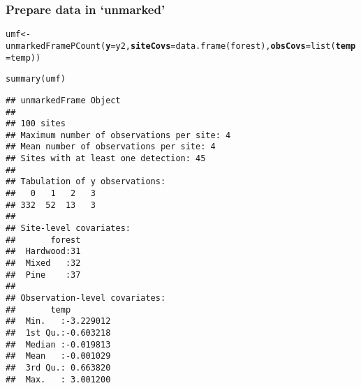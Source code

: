 \documentclass[color=usenames,dvipsnames]{beamer}\usepackage[]{graphicx}\usepackage[]{xcolor}
\makeatletter
\newcommand{\hlstd}[1]{\textcolor[rgb]{0,0,0}{#1}}%
\newcommand{\hlkwb}[1]{\textcolor[rgb]{0,0.341,0.682}{#1}}%
\newcommand{\hlkwc}[1]{\textcolor[rgb]{0,0,0}{\textbf{#1}}}%
\newcommand{\hlkwd}[1]{\textcolor[rgb]{0.004,0.004,0.506}{#1}}%
\newenvironment{kframe}{%
 \def\at@end@of@kframe{}%
 \ifinner\ifhmode%
  \def\at@end@of@kframe{\end{minipage}}%
  \begin{minipage}{\columnwidth}%
 \fi\fi%
 \def\FrameCommand##1{\hskip\@totalleftmargin \hskip-\fboxsep
 \colorbox{shadecolor}{##1}\hskip-\fboxsep
     \hskip-\linewidth \hskip-\@totalleftmargin \hskip\columnwidth}%
 \MakeFramed {\advance\hsize-\width
   \@totalleftmargin\z@ \linewidth\hsize
   \@setminipage}}%
 {\par\unskip\endMakeFramed%
 \at@end@of@kframe}
\newenvironment{knitrout}{}{} %
\makeatother
\begin{document}
\begin{frame}[fragile]
  \frametitle{Prepare data in `unmarked'}
  \small
\begin{knitrout}\tiny
{}\color{fgcolor}\begin{kframe}
\begin{alltt}
\hlstd{umf} \hlkwb{<-} \hlkwd{unmarkedFramePCount}\hlstd{(}\hlkwc{y}\hlstd{=y2,} \hlkwc{siteCovs}\hlstd{=}\hlkwd{data.frame}\hlstd{(forest),} \hlkwc{obsCovs}\hlstd{=}\hlkwd{list}\hlstd{(}\hlkwc{temp}\hlstd{=temp))}
\end{alltt}
\end{kframe}
\end{knitrout}
\pause
\begin{knitrout}\tiny
{}\color{fgcolor}\begin{kframe}
\begin{alltt}
\hlkwd{summary}\hlstd{(umf)}
\end{alltt}
\begin{verbatim}
## unmarkedFrame Object
## 
## 100 sites
## Maximum number of observations per site: 4 
## Mean number of observations per site: 4 
## Sites with at least one detection: 45 
## 
## Tabulation of y observations:
##   0   1   2   3 
## 332  52  13   3 
## 
## Site-level covariates:
##       forest  
##  Hardwood:31  
##  Mixed   :32  
##  Pine    :37  
## 
## Observation-level covariates:
##       temp          
##  Min.   :-3.229012  
##  1st Qu.:-0.603218  
##  Median :-0.019813  
##  Mean   :-0.001029  
##  3rd Qu.: 0.663820  
##  Max.   : 3.001200
\end{verbatim}
\end{kframe}
\end{knitrout}
\end{frame}
\end{document}
